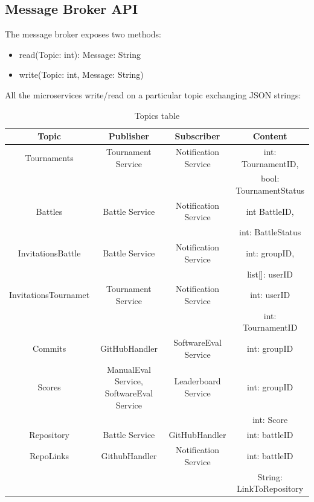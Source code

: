 \subsection{Message Broker API}
The message broker exposes two methods:
\begin{itemize}
    \item read(Topic: int): Message: String
    \item write(Topic: int, Message: String)
\end{itemize}
All the microservices write/read on a particular topic exchanging JSON strings:



\begin{table}[h]
\hspace*{-4cm}
    \begin{tabular}{|c|c|c|c|}
    \hline
        \textbf{Topic} & \textbf{Publisher} & \textbf{Subscriber} & Content\\
    \hline
        Tournaments & Tournament Service & Notification Service & int: TournamentID, \\
         & & & bool: TournamentStatus \\
    \hline
        Battles & Battle Service & Notification Service & int BattleID,\\
        & & & int: BattleStatus \\
    \hline
        InvitationsBattle & Battle Service & Notification Service & int: groupID,\\
        & & & list[]: userID \\
    \hline
        InvitationsTournamet & Tournament Service & Notification Service & int: userID\\
        & & & int: TournamentID \\
    \hline
        Commits & GitHubHandler & SoftwareEval Service & int: groupID\\
    \hline
        Scores & ManualEval Service, SoftwareEval Service & Leaderboard Service & int: groupID\\
        & & & int: Score \\
    \hline
        Repository & Battle Service & GitHubHandler & int: battleID\\
    \hline
        RepoLinks & GithubHandler & Notification Service & int: battleID\\
        & & & String: LinkToRepository \\
    \hline
    \end{tabular}
    \hspace*{-4cm}
    \caption{Topics table}
    \label{tab:my_label}
\end{table}



